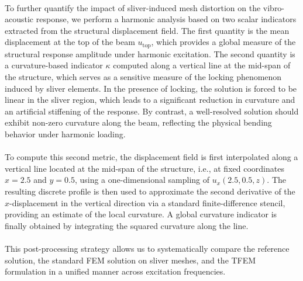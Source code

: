 \documentclass{article}
\begin{document}
\\
To further quantify the impact of sliver-induced mesh distortion on the vibro-acoustic response, we perform a harmonic analysis based on two scalar indicators extracted from the structural displacement field. The first quantity is the mean displacement at the top of the beam $u_{\text{top}}$, which provides a global measure of the structural response amplitude under harmonic excitation. The second quantity is a curvature-based indicator $\kappa$ computed along a vertical line at the mid-span of the structure, which serves as a sensitive measure of the locking phenomenon induced by sliver elements. In the presence of locking, the solution is forced to be linear in the sliver region, which leads to a significant reduction in curvature and an artificial stiffening of the response. By contrast, a well-resolved solution should exhibit non-zero curvature along the beam, reflecting the physical bending behavior under harmonic loading.\\
\\
To compute this second metric, the displacement field is first interpolated along a vertical line located at the mid-span of the structure, i.e., at fixed coordinates $x = 2.5$ and $y = 0.5$, using a one-dimensional sampling of $u_x(2.5, 0.5, z)$. The resulting discrete profile is then used to approximate the second derivative of the $x$-displacement in the vertical direction via a standard finite-difference stencil, providing an estimate of the local curvature. A global curvature indicator is finally obtained by integrating the squared curvature along the line. \\
\\
This post-processing strategy allows us to systematically compare the reference solution, the standard FEM solution on sliver meshes, and the TFEM formulation in a unified manner across excitation frequencies. \\
\\
\end{document}

